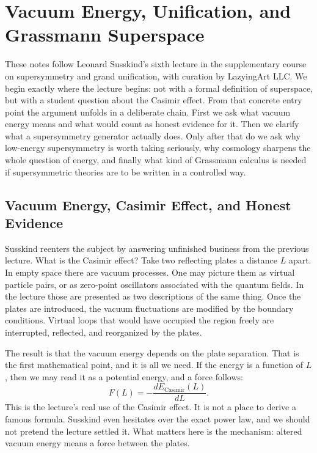 \chapter{Vacuum Energy, Unification, and Grassmann Superspace}

These notes follow Leonard Susskind's sixth lecture in the supplementary course on supersymmetry and grand unification, with curation by LazyingArt LLC. We begin exactly where the lecture begins: not with a formal definition of superspace, but with a student question about the Casimir effect. From that concrete entry point the argument unfolds in a deliberate chain. First we ask what vacuum energy means and what would count as honest evidence for it. Then we clarify what a supersymmetry generator actually does. Only after that do we ask why low-energy supersymmetry is worth taking seriously, why cosmology sharpens the whole question of energy, and finally what kind of Grassmann calculus is needed if supersymmetric theories are to be written in a controlled way.

\section{Vacuum Energy, Casimir Effect, and Honest Evidence}

Susskind reenters the subject by answering unfinished business from the previous lecture. What is the Casimir effect? Take two reflecting plates a distance \(L\) apart. In empty space there are vacuum processes. One may picture them as virtual particle pairs, or as zero-point oscillators associated with the quantum fields. In the lecture those are presented as two descriptions of the same thing. Once the plates are introduced, the vacuum fluctuations are modified by the boundary conditions. Virtual loops that would have occupied the region freely are interrupted, reflected, and reorganized by the plates.

The result is that the vacuum energy depends on the plate separation. That is the first mathematical point, and it is all we need. If the energy is a function of \(L\), then we may read it as a potential energy, and a force follows:
\begin{equation}
F(L)=-\frac{dE_{\mathrm{Casimir}}(L)}{dL}.
\end{equation}
This is the lecture's real use of the Casimir effect. It is not a place to derive a famous formula. Susskind even hesitates over the exact power law, and we should not pretend the lecture settled it. What matters here is the mechanism: altered vacuum energy means a force between the plates.

